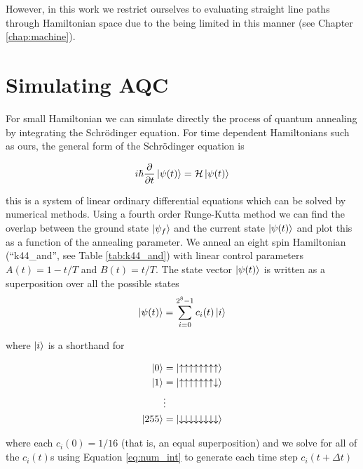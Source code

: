 However, in this work we restrict ourselves to evaluating straight line paths through Hamiltonian space due to the \machine being limited in this manner (see Chapter \ref{chap:machine}).

\section{Simulating AQC}
For small Hamiltonian we can simulate directly the process of quantum annealing by integrating the Schr\"odinger equation. For time dependent Hamiltonians such as ours, the general form of the Schr\"odinger equation is 

\begin{equation}
	i\hbar\frac{\partial}{\partial t} \mathinner{|{\psi(t)}\rangle} = \mathcal{H}\mathinner{|{\psi(t)}\rangle}
	\label{eq:num_int}
\end{equation}

this is a system of linear ordinary differential equations which can be solved by numerical methods.  Using a fourth order Runge-Kutta method\cite{comp_book} we can find the overlap between the ground state $\mathinner{|{\psi_f}\rangle}$ and the current state $\mathinner{|{\psi(t)}\rangle}$ and plot this as a function of the annealing parameter.  We anneal an eight spin Hamiltonian (``k44\_and'', see Table \ref{tab:k44_and}) with linear control parameters $A(t) = 1-t/T$ and $B(t) = t/T$.  The state vector $\mathinner{|{\psi(t)}\rangle}$ is written as a superposition over all the possible states
\begin{equation}
	\mathinner{|{\psi(t)}\rangle} = \sum_{i=0}^{2^8-1} c_i(t)\mathinner{|{i}\rangle}
\end{equation}

where $\mathinner{|{i}\rangle}$ is a shorthand for 

\begin{align}
	\mathinner{|{0}\rangle} &= \mathinner{|{\uparrow\uparrow\uparrow\uparrow\uparrow\uparrow\uparrow\uparrow}\rangle}\notag\\
	\mathinner{|{1}\rangle} &= \mathinner{|{\uparrow\uparrow\uparrow\uparrow\uparrow\uparrow\uparrow\downarrow}\rangle}\notag\\
			& \vdots\notag\\
	\mathinner{|{255}\rangle} &= \mathinner{|{\downarrow\downarrow\downarrow\downarrow\downarrow\downarrow\downarrow\downarrow}\rangle}
\end{align}

where each $c_i(0) = 1/16$ (that is, an equal superposition) and we solve for all of the $c_i(t)$s using Equation \ref{eq:num_int} to generate each time step $c_i(t + \Delta t)$

